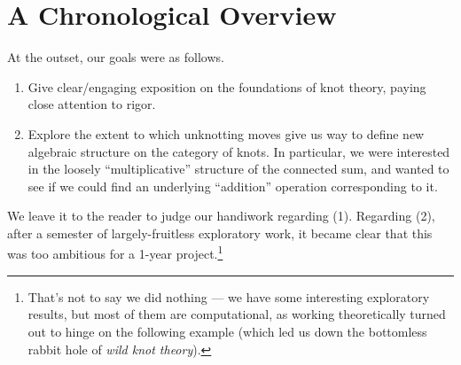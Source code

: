 \section{A Chronological Overview}\label{subsec:chronological-overview}

At the outset, our goals were as follows.
\begin{enumerate}[label=(\arabic*)]
  \item Give clear/engaging exposition on the foundations of knot
    theory, paying close attention to rigor.
  \item Explore the extent to which unknotting moves give us way to
    define new algebraic structure on the category of knots. In
    particular, we were interested in the loosely ``multiplicative''
    structure of the connected sum, and wanted to see if we could find
    an underlying ``addition'' operation corresponding to it.
\end{enumerate}
We leave it to the reader to judge our handiwork regarding (1).
Regarding (2), after a semester of largely-fruitless exploratory work,
it became clear that this was too ambitious for a 1-year
project.\footnote{That's not to say we did nothing --- we have some
  interesting exploratory results, but most of them are computational,
  as working theoretically turned out to hinge on the following
  example (which led us down the bottomless rabbit hole of \emph{wild
    knot theory}).}

